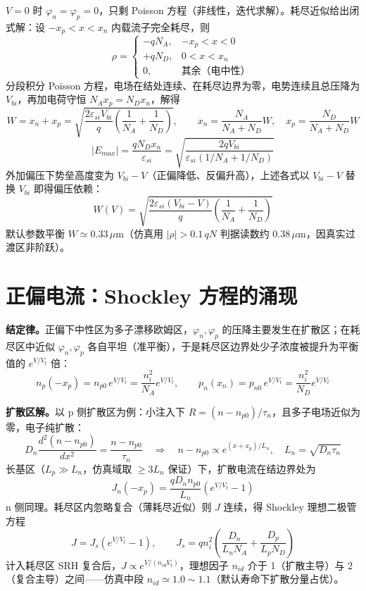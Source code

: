 \documentclass[11pt]{ctexart}
\begin{document}
$V=0$ 时 $\varphi_n=\varphi_p=0$，只剩 Poisson 方程（非线性，迭代求解）。耗尽近似给出闭式解：设 $-x_p<x<x_n$ 内载流子完全耗尽，则
\[\rho=\begin{cases}-qN_A,&-x_p<x<0\\ +qN_D,&0<x<x_n\\ 0,&\text{其余（电中性）}\end{cases}\]
分段积分 Poisson 方程，电场在结处连续、在耗尽边界为零，电势连续且总压降为 $V_{bi}$，再加电荷守恒 $N_A x_p=N_D x_n$，解得
\[W=x_n+x_p=\sqrt{\frac{2\varepsilon_{si}V_{bi}}{q}\left(\frac{1}{N_A}+\frac{1}{N_D}\right)},\qquad x_n=\frac{N_A}{N_A+N_D}W,\quad x_p=\frac{N_D}{N_A+N_D}W\]
\[|E_{max}|=\frac{qN_D x_n}{\varepsilon_{si}}=\sqrt{\frac{2qV_{bi}}{\varepsilon_{si}\left(1/N_A+1/N_D\right)}}\]
外加偏压下势垒高度变为 $V_{bi}-V$（正偏降低、反偏升高），上述各式以 $V_{bi}-V$ 替换 $V_{bi}$ 即得偏压依赖：
\[W(V)=\sqrt{\frac{2\varepsilon_{si}(V_{bi}-V)}{q}\left(\frac{1}{N_A}+\frac{1}{N_D}\right)}\]
默认参数平衡 $W\simeq0.33\,\mu\mathrm{m}$（仿真用 $|\rho|>0.1\,qN$ 判据读数约 $0.38\,\mu\mathrm{m}$，因真实过渡区非阶跃）。

\section{正偏电流：Shockley 方程的涌现}

\textbf{结定律。}正偏下中性区为多子漂移欧姆区，$\varphi_n,\varphi_p$ 的压降主要发生在扩散区；在耗尽区中近似 $\varphi_n,\varphi_p$ 各自平坦（准平衡），于是耗尽区边界处少子浓度被提升为平衡值的 $e^{V/V_t}$ 倍：
\[n_p(-x_p)=n_{p0}\,e^{V/V_t}=\frac{n_i^2}{N_A}e^{V/V_t},\qquad p_n(x_n)=p_{n0}\,e^{V/V_t}=\frac{n_i^2}{N_D}e^{V/V_t}\]

\textbf{扩散区解。}以 p 侧扩散区为例：小注入下 $R=(n-n_{p0})/\tau_n$，且多子电场近似为零，电子纯扩散：
\[D_n\frac{d^2(n-n_{p0})}{dx^2}=\frac{n-n_{p0}}{\tau_n}\quad\Longrightarrow\quad n-n_{p0}\propto e^{(x+x_p)/L_n},\quad L_n=\sqrt{D_n\tau_n}\]
长基区（$L_p\gg L_n$，仿真域取 $\ge 3L_n$ 保证）下，扩散电流在结边界处为
\[J_n(-x_p)=\frac{qD_n n_{p0}}{L_n}\left(e^{V/V_t}-1\right)\]
n 侧同理。耗尽区内忽略复合（薄耗尽近似）则 $J$ 连续，得 Shockley 理想二极管方程
\[J=J_s\left(e^{V/V_t}-1\right),\qquad J_s=q n_i^2\left(\frac{D_n}{L_n N_A}+\frac{D_p}{L_p N_D}\right)\]
计入耗尽区 SRH 复合后，$J\propto e^{V/(n_{id}V_t)}$，理想因子 $n_{id}$ 介于 1（扩散主导）与 2（复合主导）之间——仿真中段 $n_{id}\simeq1.0\sim1.1$（默认寿命下扩散分量占优）。
\end{document}
